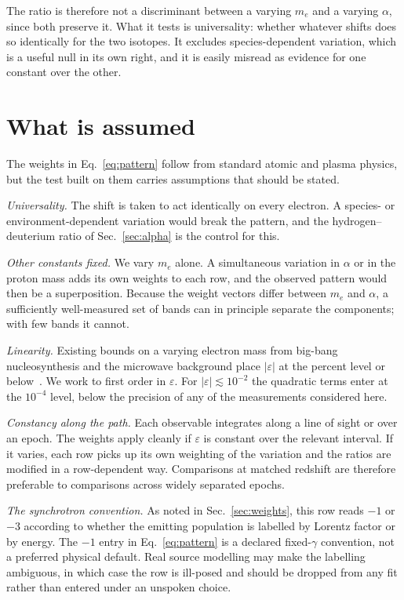 \documentclass[aps,prd,twocolumn,superscriptaddress,nofootinbib,10pt]{revtex4-2}
\begin{document}
The ratio is therefore not a discriminant between a varying $m_e$ and a varying $\alpha$, since
both preserve it. What it tests is universality: whether whatever shifts does so identically for
the two isotopes. It excludes species-dependent variation, which is a useful null in its own right,
and it is easily misread as evidence for one constant over the other.

\section{What is assumed}\label{sec:assume}

The weights in Eq.~\eqref{eq:pattern} follow from standard atomic and plasma physics, but the test
built on them carries assumptions that should be stated.

\emph{Universality.} The shift is taken to act identically on every electron. A species- or
environment-dependent variation would break the pattern, and the hydrogen--deuterium ratio of
Sec.~\ref{sec:alpha} is the control for this.

\emph{Other constants fixed.} We vary $m_e$ alone. A simultaneous variation in $\alpha$ or in the
proton mass adds its own weights to each row, and the observed pattern would then be a
superposition. Because the weight vectors differ between $m_e$ and $\alpha$, a sufficiently
well-measured set of bands can in principle separate the components; with few bands it cannot.

\emph{Linearity.} Existing bounds on a varying electron mass from big-bang nucleosynthesis and
the microwave background place $|\varepsilon|$ at the percent level or
below~\cite{SetoToda2023,HartChluba2020}. We work to first order in $\varepsilon$. For
$|\varepsilon| \lesssim 10^{-2}$ the quadratic terms enter at the $10^{-4}$ level, below the
precision of any of the measurements considered here.

\emph{Constancy along the path.} Each observable integrates along a line of sight or over an epoch.
The weights apply cleanly if $\varepsilon$ is constant over the relevant interval. If it varies,
each row picks up its own weighting of the variation and the ratios are modified in a
row-dependent way. Comparisons at matched redshift are therefore preferable to comparisons across
widely separated epochs.

\emph{The synchrotron convention.} As noted in Sec.~\ref{sec:weights}, this row reads $-1$ or $-3$
according to whether the emitting population is labelled by Lorentz factor or by energy. The
$-1$ entry in Eq.~\eqref{eq:pattern} is a declared fixed-$\gamma$ convention, not a preferred
physical default. Real source modelling may make the labelling ambiguous, in which case the row
is ill-posed and should be dropped from any fit rather than entered under an unspoken choice.
\end{document}
